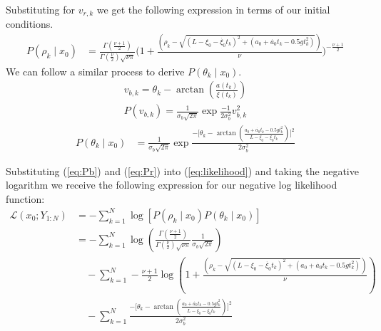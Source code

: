 \documentclass[11pt]{article}
\begin{document}
\begin{enumerate}[label=\alph*)]
    Substituting for $v_{r,k}$ we get the following expression in terms of our initial conditions. 
    \begin{align}
        P(\rho_k \mid x_0) &= \frac{\Gamma(\frac{\nu + 1}{2})}{\Gamma(\frac{\nu}{2})\sqrt{\nu\pi}}\Big(1+\frac{(\rho_k - \sqrt{(L-\xi_0 - \dot{\xi_0}t_k)^2 + (a_0 + \dot{a_0}t_k - 0.5gt_k^2)})}{\nu} \Big)^{-\frac{\nu+1}{2}}
        \label{eq:Pr}
    \end{align}
    We can follow a similar process to derive $P(\theta_k \mid x_0)$.
    \begin{align*}
        v_{b,k} = \theta_k - \arctan(\frac{a(t_k)}{\xi(t_k)}) \\
        P(v_{b,k}) = \frac{1}{\sigma_b\sqrt{2\pi}}\exp{\frac{-1}{2\sigma_b^2}v_{b,k}^2}
    \end{align*}
    \begin{align}
        P(\theta_k \mid x_0) &= \frac{1}{\sigma_b \sqrt{2\pi}} \exp{\frac{-\Big[\theta_k-\arctan(\frac{a_0+\dot{a_0}t_k-0.5gt_k^2}{L-\xi_0-\dot{\xi_0}t_k})\Big]^2}{2\sigma_b^2}}
        \label{eq:Pb}
    \end{align}

    Substituting (\ref{eq:Pb}) and (\ref{eq:Pr}) into (\ref{eq:likelihood}) and taking the negative logarithm
    we receive the following expression for our negative log likelihood function:
    \begin{equation}
        \begin{split}
            \mathcal{L}(x_0;Y_{1:N}) &= - \sum_{k=1}^N \log[P(\rho_k \mid x_0) P(\theta_k \mid x_0)] \\
            &= - \sum_{k=1}^N \log(\frac{\Gamma(\frac{\nu + 1}{2})}{\Gamma(\frac{\nu}{2})\sqrt{\nu\pi}}\frac{1}{\sigma_b \sqrt{2\pi}}) 
            \\ &\quad -\sum_{k=1}^N -\frac{\nu+1}{2}\log(1+\frac{(\rho_k - \sqrt{(L-\xi_0 - \dot{\xi_0}t_k)^2 + (a_0 + \dot{a_0}t_k - 0.5gt_k^2)})}{\nu} ) \\
            &\quad -\sum_{k=1}^N \frac{-\Big[\theta_k-\arctan(\frac{a_0+\dot{a_0}t_k-0.5gt_k^2}{L-\xi_0-\dot{\xi_0}t_k})\Big]^2}{2\sigma_b^2}
        \end{split}
        \label{eq:JNLL}
    \end{equation}


\end{enumerate}
\end{document}
